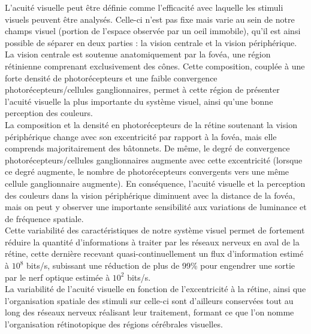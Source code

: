 L'acuité visuelle peut être définie comme l'efficacité  avec laquelle les stimuli visuels peuvent être analysés. Celle-ci n'est pas fixe mais varie au sein de notre champs visuel (portion de l'espace observée par un oeil immobile), qu'il est ainsi possible de séparer en deux parties : la vision centrale et la vision périphérique.\autocite{Werner2014} \\
La vision centrale est soutenue anatomiquement par la fovéa, une région rétinienne comprenant exclusivement des cônes. Cette composition, couplée à une forte densité de photorécepteurs et une faible convergence photorécepteurs/cellules ganglionnaires, permet à cette région de présenter l'acuité visuelle la plus importante du système visuel, ainsi qu'une bonne perception des couleurs. \autocite{Werner2014} \\
La composition et la densité en photorécepteurs de la rétine soutenant la vision périphérique change avec son excentricité par rapport à la fovéa, mais elle comprends majoritairement des bâtonnets. 
De même, le degré de convergence photorécepteurs/cellules ganglionnaires augmente avec cette excentricité (lorsque ce degré augmente, le nombre de photorécepteurs convergents vers une même cellule ganglionnaire augmente).
En conséquence, l'acuité visuelle et la perception des couleurs dans la vision périphérique diminuent avec la distance de la fovéa, mais on peut y observer une importante sensibilité aux variations de luminance et de fréquence spatiale. \autocite{Werner2014} \\
Cette variabilité des caractéristiques de notre système visuel permet de fortement réduire la quantité d'informations à traiter par les réseaux nerveux en aval de la rétine, cette dernière recevant quasi-continuellement un flux d'information estimé à $10^{8}$ bits/s, subissant une réduction de plus de 99\% pour engendrer une sortie par le nerf optique estimée à $10^{2}$ bits/s. \autocite{Kortum1996, Werner2014, Zhaoping2014} \\
La variabilité de l'acuité visuelle en fonction de l'excentricité à la rétine, ainsi que l'organisation spatiale des stimuli sur celle-ci sont d'ailleurs conservées tout au long des réseaux nerveux réalisant leur traitement, formant ce que l'on nomme l'organisation rétinotopique des régions cérébrales visuelles. \autocite{Werner2014} \\

